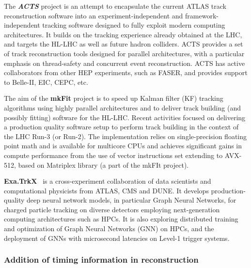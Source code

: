 The \emph{\textbf{ACTS}} project \cite{Ai:2019kze,Gumpert_2017} is an attempt to encapsulate
the current ATLAS track reconstruction software into an
experiment-independent and framework-independent tracking software
designed to fully exploit modern computing architectures. It builds on
the tracking experience already obtained at the LHC, and targets the
HL-LHC as well as future hadron colliders. ACTS provides a set of track
reconstruction tools designed for parallel architectures, with a
particular emphasis on thread-safety and concurrent event
reconstruction. ACTS has active collaborators from other HEP
experiments, such as FASER, and provides support to Belle-II, EIC, CEPC,
etc.

The aim of the \textbf{mkFit} project is to speed up Kalman filter (KF)
tracking algorithms using highly parallel architectures and to deliver
track building (and possibly fitting) software for the HL-LHC. Recent
activities focused on delivering a production quality software setup to
perform track building in the context of the LHC Run-3 (or Run-2). The
implementation relies on single-precision floating point math and is
available for multicore CPUs and achieves significant gains in compute
performance from the use of vector instructions set extending to
AVX-512, based on Matriplex library (a part of the mkFIt project).

\textbf{Exa.TrkX}~\cite{Ju:2020xty} is a cross-experiment collaboration of data scientists
and computational physicists from ATLAS, CMS and DUNE. It develops
production-quality deep neural network models, in particular Graph
Neural Networks, for charged particle tracking on diverse detectors
employing next-generation computing architectures such as HPCs. It is
also exploring distributed training and optimization of Graph Neural
Networks (GNN) on HPCs, and the deployment of GNNs with microsecond
latencies on Level-1 trigger systems.

\hypertarget{addition-of-timing-information-in-reconstruction}{%
\subsubsection{Addition of timing information in
reconstruction}\label{addition-of-timing-information-in-reconstruction}}

